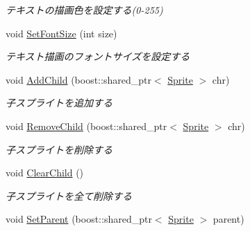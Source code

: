 \begin{DoxyCompactItemize}
\begin{DoxyCompactList}\small\item\em テキストの描画色を設定する(0-\/255) \end{DoxyCompactList}\item 
void \hyperlink{class_sprite_a13145ca2b7ad2f0881f2a06b31fa2937}{Set\+Font\+Size} (int size)\hypertarget{class_sprite_a13145ca2b7ad2f0881f2a06b31fa2937}{}\label{class_sprite_a13145ca2b7ad2f0881f2a06b31fa2937}

\begin{DoxyCompactList}\small\item\em テキスト描画のフォントサイズを設定する \end{DoxyCompactList}\item 
void \hyperlink{class_sprite_ad90bd4a0eda1d12d37c4e740ce4c69d5}{Add\+Child} (boost\+::shared\+\_\+ptr$<$ \hyperlink{class_sprite}{Sprite} $>$ chr)\hypertarget{class_sprite_ad90bd4a0eda1d12d37c4e740ce4c69d5}{}\label{class_sprite_ad90bd4a0eda1d12d37c4e740ce4c69d5}

\begin{DoxyCompactList}\small\item\em 子スプライトを追加する \end{DoxyCompactList}\item 
void \hyperlink{class_sprite_a25d21de7dc41150e49d10374c6fe227b}{Remove\+Child} (boost\+::shared\+\_\+ptr$<$ \hyperlink{class_sprite}{Sprite} $>$ chr)\hypertarget{class_sprite_a25d21de7dc41150e49d10374c6fe227b}{}\label{class_sprite_a25d21de7dc41150e49d10374c6fe227b}

\begin{DoxyCompactList}\small\item\em 子スプライトを削除する \end{DoxyCompactList}\item 
void \hyperlink{class_sprite_a063c4d0a341d1ea48e17f3baa4f420a0}{Clear\+Child} ()\hypertarget{class_sprite_a063c4d0a341d1ea48e17f3baa4f420a0}{}\label{class_sprite_a063c4d0a341d1ea48e17f3baa4f420a0}

\begin{DoxyCompactList}\small\item\em 子スプライトを全て削除する \end{DoxyCompactList}\item 
void \hyperlink{class_sprite_a35deac40351bf9902cf89985ace6cdce}{Set\+Parent} (boost\+::shared\+\_\+ptr$<$ \hyperlink{class_sprite}{Sprite} $>$ parent)\hypertarget{class_sprite_a35deac40351bf9902cf89985ace6cdce}{}\label{class_sprite_a35deac40351bf9902cf89985ace6cdce}


\end{DoxyCompactItemize}
